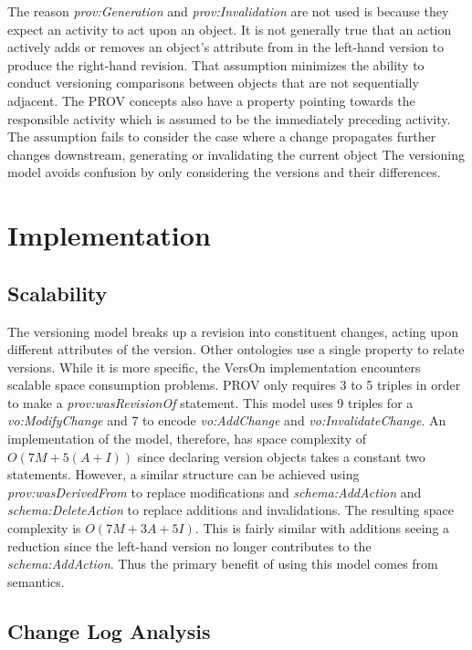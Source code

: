 The reason \textit{prov:Generation} and \textit{prov:Invalidation} are not used is because they expect an activity to act upon an object.
It is not generally true that an action actively adds or removes an object's attribute from in the left-hand version to produce the right-hand revision.
That assumption minimizes the ability to conduct versioning comparisons between objects that are not sequentially adjacent.
The PROV concepts also have a property pointing towards the responsible activity which is assumed to be the immediately preceding activity.
The assumption fails to consider the case where a change propagates further changes downstream, generating or invalidating the current object
The versioning model avoids confusion by only considering the versions and their differences.

\section{Implementation}

\subsection{Scalability}

The versioning model breaks up a revision into constituent changes, acting upon different attributes of the version.
Other ontologies use a single property to relate versions.
While it is more specific, the VersOn implementation encounters scalable space consumption problems.
PROV only requires 3 to 5 triples in order to make a \textit{prov:wasRevisionOf} statement.
This model uses 9 triples for a \textit{vo:ModifyChange} and 7 to encode \textit{vo:AddChange} and \textit{vo:InvalidateChange}.
An implementation of the model, therefore, has space complexity of \(O(7M+5(A+I))\) since declaring version objects takes a constant two statements.
However, a similar structure can be achieved using \textit{prov:wasDerivedFrom} to replace modifications and \textit{schema:AddAction} and \textit{schema:DeleteAction} to replace additions and invalidations.
The resulting space complexity is \(O(7M+3A+5I)\).
This is fairly similar with additions seeing a reduction since the left-hand version no longer contributes to the \textit{schema:AddAction}.
Thus the primary benefit of using this model comes from semantics.

\subsection{Change Log Analysis}

